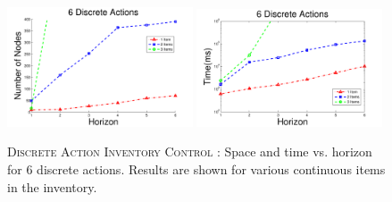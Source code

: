 \documentclass[twoside,11pt]{article}
\newcommand{\InventoryControl}{\textsc{Inventory Control }}
\begin{document}
\begin{figure}[tbp!]
\vspace{-2mm}
\centering
\includegraphics[width=0.49\textwidth]{Figures2/camdp/invD6Node.pdf}
\includegraphics[width=0.49\textwidth]{Figures2/camdp/invD6Time.pdf}
\vspace{-2mm}
\caption{%
\textsc{Discrete Action} \InventoryControl: Space and time vs. horizon for 6 discrete actions. Results are shown for various continuous items in the inventory.
}
\label{fig:invD6}
\vspace{-2mm}
\end{figure}
\end{document}
